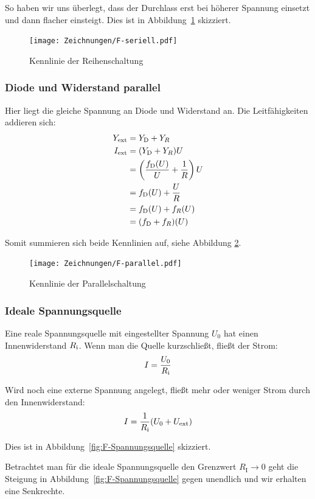 So haben wir uns überlegt, dass der Durchlass erst bei höherer Spannung
einsetzt und dann flacher einsteigt. Dies ist in Abbildung~\ref{fig:F-seriell}
skizziert.

\begin{figure}[h]
	\centering
	\caption{%
		Kennlinie der Reihenschaltung
	}
	\label{fig:F-seriell}
	\texttt{[image: Zeichnungen/F-seriell.pdf]}
\end{figure}

\subsubsection{Diode und Widerstand parallel}

Hier liegt die gleiche Spannung an Diode und Widerstand an. Die Leitfähigkeiten
addieren sich:
\begin{align*}
	Y_\text{ext} &= Y_\text D + Y_R \\
	I_\text{ext} &= (Y_\text D + Y_R) U \\
	&= \del{\frac{f_\text D(U)}U + \frac 1R} U \\
	&= f_\text D (U) + \frac UR \\
	&= f_\text D (U) + f_R(U) \\
	&= (f_\text D + f_R)(U)
\end{align*}

Somit summieren sich beide Kennlinien auf, siehe Abbildung
\ref{fig:F-parallel}.

\begin{figure}[h]
	\centering
	\caption{%
		Kennlinie der Parallelschaltung
	}
	\label{fig:F-parallel}
	\texttt{[image: Zeichnungen/F-parallel.pdf]}
\end{figure}

\subsubsection{Ideale Spannungsquelle}

Eine reale Spannungsquelle mit eingestellter Spannung $U_0$ hat einen
Innenwiderstand $R_\text i$. Wenn man die Quelle kurzschließt, fließt der
Strom:
\[
	I = \frac{U_0}{R_\text i}
\]

Wird noch eine externe Spannung angelegt, fließt mehr oder weniger Strom durch
den Innenwiderstand:
\[
	I = \frac{1}{R_\text i} (U_0 + U_\text{ext})
\]

Dies ist in Abbildung~\ref{fig:F-Spannungsquelle} skizziert.

Betrachtet man für die ideale Spannungsquelle den Grenzwert $R_\text{I}\to0$
geht die Steigung in Abbildung~\ref{fig:F-Spannungsquelle} gegen unendlich und
wir erhalten eine Senkrechte.

